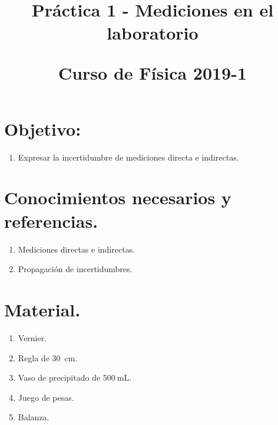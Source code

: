 
\title{Práctica 1 - Mediciones en el laboratorio \\ \begin{Large}Curso de Física 2019-1\end{Large}}
\setlength{\voffset}{-1cm}

\maketitle
\vspace*{-3cm} 
\fontsize{14}{14}\selectfont
\section{Objetivo:}
\begin{enumerate}
\item Expresar la incertidumbre de mediciones directa e indirectas.
\end{enumerate}
\section{Conocimientos necesarios y referencias.}
\begin{multicols}{2}
\begin{enumerate}[label=\roman*.]
\itemsep-1em 
\item Mediciones directas e indirectas. \\
\item Propagación de incertidumbres. \\
\end{enumerate}
\end{multicols}
\section{Material.}
\begin{multicols}{2}
\begin{enumerate}[label=\alph*.]
\itemsep0em 
\item Vernier.
\item Regla de \SI{30}{\cm}.
\item Vaso de precipitado de $\SI{500}{\milli\liter}$.
\item Juego de pesas.
\item Balanza.
\end{enumerate}
\end{multicols}
